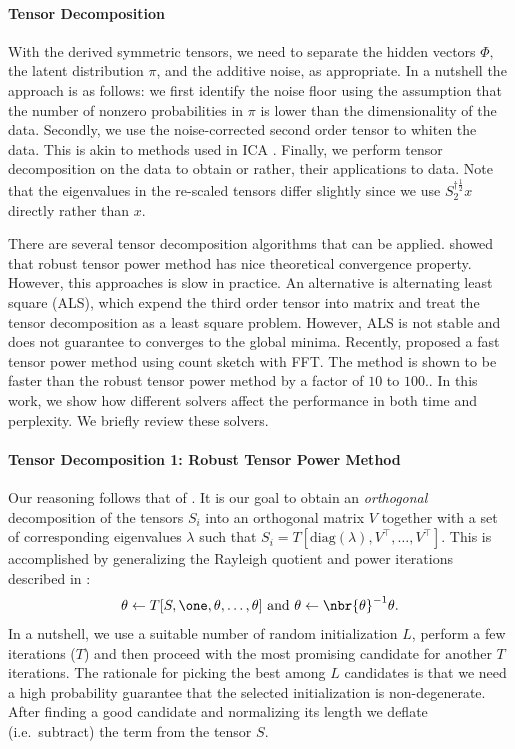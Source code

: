 \documentclass[twoside,11pt]{article}
\begin{document}
{\paragraph{Tensor Decomposition} 
With the derived symmetric tensors, we need to separate the hidden
vectors $\Phi,$ the latent distribution $\pi$, and the additive
noise, as appropriate. In a nutshell the approach is as follows: we
first identify the noise floor using the assumption that the number of
nonzero probabilities in $\pi$ is lower than the dimensionality of the
data. Secondly, we use the noise-corrected second order tensor to
whiten the data. This is akin to methods used in ICA
\citep{Cardoso98}. Finally, we perform tensor decomposition on the 
data to obtain  or rather, their applications to
data. Note that the eigenvalues in the re-scaled tensors differ slightly
since we use {$S_2^{\dag \frac{1}{2}} x$} directly rather than $x$.

There are several tensor decomposition algorithms that can be applied. 
 \cite{AnaGeHsuKakTel12} showed that robust  tensor power method has 
 nice theoretical convergence property. However, this approaches is slow in 
 practice. An alternative is alternating least square (ALS), which expend the 
 third order tensor into matrix and treat the tensor decomposition as 
  a least square problem. However, ALS is not stable and does not guarantee 
  to converges to the global minima. Recently, \cite{WanTunSmoAna15} proposed 
  a fast tensor power method using count sketch with FFT. The method is 
  shown to be faster than the robust tensor power method by a factor of $10$ to $100.$. 
  In this work, we show how different solvers affect the performance in both time and perplexity. We briefly review these solvers.

\paragraph{Tensor Decomposition 1: Robust Tensor Power Method}
\label{sec:rptm}

Our reasoning follows that of \cite{AnaGeHsuKakTel12}. It is our goal
to obtain an \emph{orthogonal} decomposition of the tensors $S_i$
into an orthogonal matrix $V$ together with a set of corresponding
eigenvalues $\lambda$ such that $S_i = T[\mathrm{diag}(\lambda),
V^\top, \ldots, V^\top]$. This is accomplished by generalizing the
Rayleigh quotient and power iterations
described in \citep[Algorithm 1]{AnaGeHsuKakTel12}:
\begin{align}
  \label{eq:tensorpower}
  \theta \leftarrow {T[S, \one, \theta, \ldots,
    \theta]}
  \text{ and }
  \theta \leftarrow \nbr{\theta}^{-1} \theta.
\end{align}
%
In a nutshell, we use a suitable number of random initialization $L$,
perform a few iterations ($T$) and then proceed with the most
promising candidate for another $T$ iterations. The rationale for
picking the best among $L$ candidates is that we need a high
probability guarantee that the selected initialization is
non-degenerate. After finding a good candidate and normalizing its
length we deflate (i.e.\ subtract) the term from the tensor $S$.


}
\end{document}
